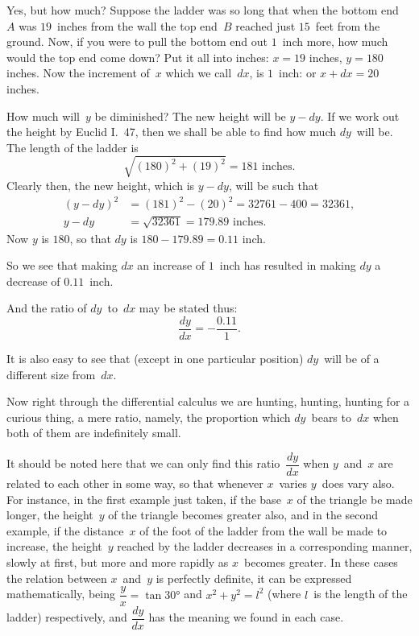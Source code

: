 \documentclass[12pt]{book}[2005/09/16]
\newcommand{\DPPageSep}[2]{\Pagelabel{#2}}
\newcommand{\Pagelabel}[1]
  {\phantomsection\label{#1}}
\begin{document}
Yes, but how much? Suppose the ladder was so
long that when the bottom end~$A$ was $19$~inches from
the wall the top end~$B$ reached just $15$~feet from the
ground. Now, if you were to pull the bottom end
out $1$~inch more, how much would the top end come
down? Put it all into inches: $x = 19$ inches, $y = 180$
inches. Now the increment of~$x$ which we call~$dx$,
is $1$~inch: or $x + dx = 20$ inches.

How much will~$y$ be diminished? The new height
will be $y - dy$. If we work out the height by Euclid
I.~47, then we shall be able to find how much $dy$~will
be. The length of the ladder is
\[
\sqrt{ (180)^2 + (19)^2 } = 181 \text{ inches}.
\]
Clearly then, the new height, which is $y - dy$, will be
such that
\begin{align*}
(y - dy)^2 &= (181)^2 - (20)^2 = 32761 - 400 = 32361,   \\
y - dy     &= \sqrt{32361} = 179.89 \text{ inches}.
\end{align*}
Now $y$ is $180$, so that $dy$ is $180 - 179.89 = 0.11$ inch.

So we see that making $dx$ an increase of $1$~inch
has resulted in making $dy$ a decrease of $0.11$~inch.

And the ratio of $dy$~to~$dx$ may be stated thus:
\[
\frac{dy}{dx} = - \frac{0.11}{1}.
\]

It is also easy to see that (except in one particular
position) $dy$~will be of a different size from~$dx$.

Now right through the differential calculus we
are hunting, hunting, hunting for a curious thing,
\DPPageSep{025.png}{13}%
a mere ratio, namely, the proportion which $dy$~bears
to~$dx$ when both of them are indefinitely
small.

It should be noted here that we can only find
this ratio~$\dfrac{dy}{dx}$ when $y$~and~$x$ are related to each
other in some way, so that whenever $x$~varies $y$~does
vary also. For instance, in the first example just
taken, if the base~$x$ of the triangle be made longer,
the height~$y$ of the triangle becomes greater also,
and in the second example, if the distance~$x$ of the
foot of the ladder from the wall be made to increase,
the height~$y$ reached by the ladder decreases in a
corresponding manner, slowly at first, but more and
more rapidly as $x$~becomes greater. In these cases
the relation between $x$~and~$y$ is perfectly definite,
it can be expressed mathematically, being $\dfrac{y}{x} = \tan 30°$
and $x^2 + y^2 = l^2$ (where $l$~is the length of the ladder)
respectively, and $\dfrac{dy}{dx}$ has the meaning we found in
each case.
\end{document}
